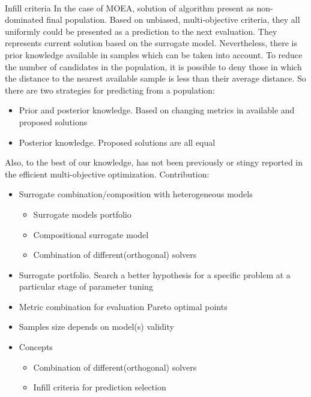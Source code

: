         \paragraph{}{Infill criteria}
        In the case of MOEA, solution of algorithm present as non-dominated final population. Based on unbiased, multi-objective criteria, they all uniformly could be presented as a prediction to the next evaluation. They represents current solution based on the surrogate model. Nevertheless, there is prior knowledge available in samples which can be taken into account. To reduce the number of candidates in the population, it is possible to deny those in which the distance to the nearest available sample is less than their average distance.
        So there are two strategies for predicting from a population:
        \begin{itemize}
            \item Prior and posterior knowledge. Based on changing metrics in available and proposed solutions
            \item Posterior knowledge. Proposed solutions are all equal
        \end{itemize}


        
        Also, to the best of our knowledge, has not been previously or stingy reported in the efficient multi-objective optimization.
        Contribution:
        \begin{itemize}
            \item Surrogate combination/composition with heterogeneous models
                \begin{itemize}
                    \item Surrogate models portfolio
                    \item Compositional surrogate model
                    \item Combination of different(orthogonal) solvers
                \end{itemize}
            \item Surrogate portfolio. Search a better hypothesis  for a specific problem at a particular stage of parameter tuning
            \item Metric combination for evaluation Pareto optimal points
            \item Samples size depends on model(s) validity
            \item Concepts
                \begin{itemize}
                    \item Combination of different(orthogonal) solvers
                    \item Infill criteria for prediction selection
                \end{itemize}
        \end{itemize}

